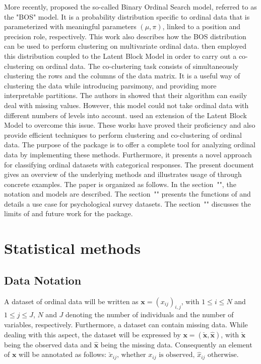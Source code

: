 More recently, \citet{biernacki16} proposed the so-called Binary Ordinal Search model, referred to as the "BOS" model. It is a probability distribution specific to ordinal data that is parameterized with meaningful parameters $(\mu,\pi)$, linked to a position and precision role, respectively. This work also describes how the BOS distribution can be used to perform clustering on multivariate ordinal data. \citet{jacques17} then employed this distribution coupled to the Latent Block Model \citep{Govaert2003} in order to carry out a co-clustering on ordinal data. The co-clustering task consists of simultaneously clustering the rows and the columns of the data matrix. It is a useful way of clustering the data while introducing parsimony, and providing more interpretable partitions. The authors in \cite{jacques17} showed that their algorithm can easily deal with missing values. However, this model could not take ordinal data with different numbers of levels into account. \citet{Selosse18} used an extension of the Latent Block Model to overcome this issue. These works have proved their proficiency and also provide efficient techniques to perform clustering and co-clustering of ordinal data. The purpose of the  package is to offer a complete tool for analyzing ordinal data by implementing these methods. Furthermore, it presents a novel approach for classifying ordinal datasets with categorical responses. The present document gives an overview of the underlying methods and illustrates usage of  through concrete examples. The paper is organized as follows. In the section~"", the notation and models are described. The section~"" presents the functions of  and details a use case for psychological survey datasets. The section~"" discusses the limits of  and future work for the package.


\section{Statistical methods}
\label{sec:stat-methods}
\subsection{Data Notation}
A dataset of ordinal data will be written as $\boldsymbol{x}=\left(x_{ij}\right)_{i,j}$, with $1 \leq i \leq N$ and $1 \leq j \leq J$, $N$ and $J$ denoting the number of individuals and the number of variables, respectively. Furthermore, a dataset can contain missing data. While dealing with this aspect, the dataset will be expressed by $\boldsymbol{x} =\left(\boldsymbol{\check{x}},\boldsymbol{\hat{x}}\right)$, with $\boldsymbol{\check{x}}$ being the observed data and $\boldsymbol{\hat{x}}$ being the missing data. Consequently an element of $\boldsymbol{x}$ will be annotated as follows:
$
\check{x}_{ij}\text{, whether }{x}_{ij}\text{ is observed, }\hat{x}_{ij}\text{ otherwise}
$. 


